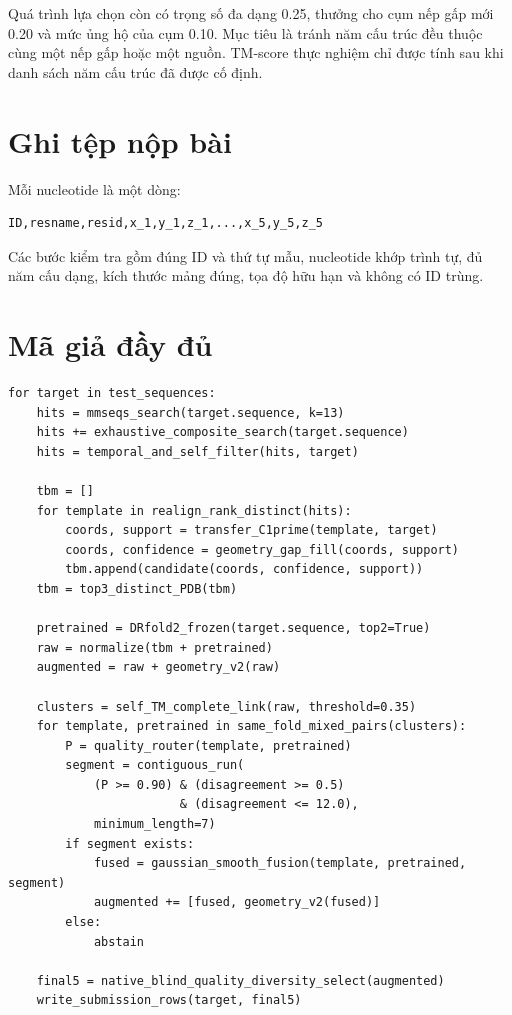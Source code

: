 \documentclass[12pt,a4paper,oneside]{report}
\begin{document}
Quá trình lựa chọn còn có trọng số đa dạng 0.25, thưởng cho cụm nếp gấp mới 0.20 và mức
ủng hộ của cụm 0.10. Mục tiêu là tránh năm cấu trúc đều thuộc cùng một nếp gấp hoặc một
nguồn. TM-score thực nghiệm chỉ được tính sau khi danh sách năm cấu trúc đã được cố định.

\section{Ghi tệp nộp bài}

Mỗi nucleotide là một dòng:

\begin{lstlisting}
ID,resname,resid,x_1,y_1,z_1,...,x_5,y_5,z_5
\end{lstlisting}

Các bước kiểm tra gồm đúng ID và thứ tự mẫu, nucleotide khớp trình tự, đủ năm cấu dạng,
kích thước mảng đúng, tọa độ hữu hạn và không có ID trùng.

\section{Mã giả đầy đủ}

\begin{lstlisting}
for target in test_sequences:
    hits = mmseqs_search(target.sequence, k=13)
    hits += exhaustive_composite_search(target.sequence)
    hits = temporal_and_self_filter(hits, target)

    tbm = []
    for template in realign_rank_distinct(hits):
        coords, support = transfer_C1prime(template, target)
        coords, confidence = geometry_gap_fill(coords, support)
        tbm.append(candidate(coords, confidence, support))
    tbm = top3_distinct_PDB(tbm)

    pretrained = DRfold2_frozen(target.sequence, top2=True)
    raw = normalize(tbm + pretrained)
    augmented = raw + geometry_v2(raw)

    clusters = self_TM_complete_link(raw, threshold=0.35)
    for template, pretrained in same_fold_mixed_pairs(clusters):
        P = quality_router(template, pretrained)
        segment = contiguous_run(
            (P >= 0.90) & (disagreement >= 0.5)
                        & (disagreement <= 12.0),
            minimum_length=7)
        if segment exists:
            fused = gaussian_smooth_fusion(template, pretrained, segment)
            augmented += [fused, geometry_v2(fused)]
        else:
            abstain

    final5 = native_blind_quality_diversity_select(augmented)
    write_submission_rows(target, final5)
\end{lstlisting}
\end{document}
